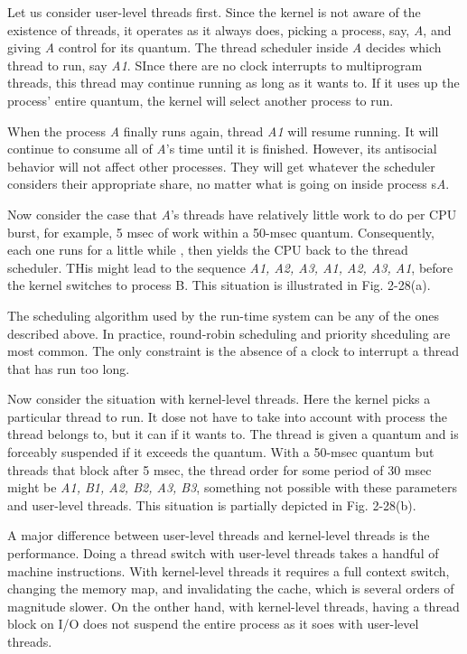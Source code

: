 \documentclass{book}
\newcommand {\sys} [1] {\textsl{#1}}
\begin{document}
Let us consider user-level threads first.
Since the kernel is not aware of the existence of threads,
it operates as it always does, picking a process, say, \sys{A}, and giving \sys{A} control for its quantum.
The thread scheduler inside \sys{A} decides which thread to run, say \sys{A1}.
SInce there are no clock interrupts to multiprogram threads, this thread may continue running as long as it wants to.
If it uses up the process' entire quantum, the kernel will select another process to run.

When the process \sys{A} finally runs again, thread \sys{A1} will resume running.
It will continue to consume all of \sys{A}'s time until it is finished.
However, its antisocial behavior will not affect other processes.
They will get whatever the scheduler considers their appropriate share, no matter what is going on inside process s\sys{A}.

Now consider the case that \sys{A}'s threads have relatively little work to do per CPU burst, for example, 5 msec of work within a 50-msec quantum.
Consequently, each one runs for a little while , then yields the CPU back to the thread scheduler.
THis might lead to the sequence \sys{A1, A2, A3, A1, A2, A3, A1}, before the kernel switches to process B.
This situation is illustrated in Fig. 2-28(a).

The scheduling algorithm used by the run-time system can be any of the ones described above.
In practice, round-robin scheduling and priority shceduling are most common.
The only constraint is the absence of a clock to interrupt a thread that has run too long.

Now consider the situation with kernel-level threads.
Here the kernel picks a particular thread to run.
It dose not have to take into account with process the thread belongs to, but it can if it wants to.
The thread is given a quantum and is forceably suspended if it exceeds the quantum.
With a 50-msec quantum but threads that block after 5 msec, the thread order for some period of 30 msec might be \sys{A1, B1, A2, B2, A3, B3},
something not possible with these parameters and user-level threads.
This situation is partially depicted in Fig. 2-28(b).

A major difference between user-level threads and kernel-level threads is the performance.
Doing a thread switch with user-level threads takes a handful of machine instructions.
With kernel-level threads it requires a full context switch, changing the memory map, and invalidating the cache, 
which is several orders of magnitude slower.
On the onther hand, with kernel-level threads, having a thread block on I/O does not suspend the entire process as it soes with user-level threads.
\end{document}
